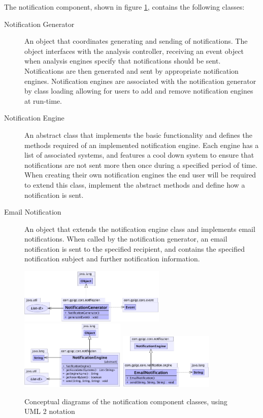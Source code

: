 \documentclass[10pt,a4paper]{article}
\begin{document}
The notification component, shown in figure
\ref{fig:notificationComponent}, contains the following classes:

\begin{description}
  \item [Notification Generator] An object that coordinates generating and
    sending of notifications. The object interfaces with the analysis
    controller, receiving an event object when analysis engines specify that
    notifications should be sent. Notifications are then generated and sent by
    appropriate notification engines. Notification engines are associated with
    the notification generator by class loading allowing for users to add and
    remove notification engines at run-time.

  \item [Notification Engine] An abstract class that implements the basic
    functionality and defines the methods required of an implemented
    notification engine. Each engine has a list of associated systems, and 
    features a cool down system to ensure that notifications are not sent
    more then once during a specified period of time. When creating their
    own notification engines the end user will be required to extend this
    class, implement the abstract methods and define how a notification
    is sent.

  \item [Email Notification] An object that extends the notification engine
    class and implements email notifications. When called by the notification
    generator, an email notification is sent to the specified recipient, and 
    contains the specified notification subject and further notification
    information.
\end{description}
 
\begin{figure}[ht!]
  \centering
  \includegraphics[width= 7cm]{images/Notification/NotificationGenerator.png}
  \includegraphics[width= 5cm]{images/Notification/NotificationEngine.png}
  \includegraphics[width= 4.5cm]{images/Notification/EmailNotification.png}
  \caption{Conceptual diagrams of the notification component classes, using 
UML 2 notation}
  \label{fig:notificationComponent}
\end{figure}
\end{document}

